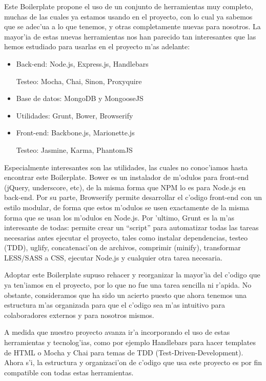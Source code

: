 Este Boilerplate propone el uso de un conjunto de herramientas muy completo, muchas de las cuales ya estamos usando en el proyecto, con lo cual ya sabemos
que se adec'ua a lo que tenemos, y otras completamente nuevas para nosotros. La mayor'ia de estas nuevas herramientas nos han parecido tan interesantes que
las hemos estudiado para usarlas en el proyecto m'as adelante:

\begin{itemize}
 \item Back-end: Node.js, Express.js, Handlebars
 
	Testeo: Mocha, Chai, Sinon, Proxyquire
	
 \item Base de datos: MongoDB y MongooseJS
 
 \item Utilidades: Grunt, Bower, Browserify
 
 \item Front-end: Backbone.js, Marionette.js
 
	Testeo: Jasmine, Karma, PhantomJS
	
\end{itemize}

Especialmente interesantes son las utilidades, las cuales no conoc'iamos hasta encontrar este Boilerplate. Bower es un instalador de m'odulos para front-end
(jQuery, underscore, etc), de la misma forma que NPM lo es para Node.js en back-end. Por su parte, Browserify permite desarrollar el c'odigo front-end con un
estilo modular, de forma que estos m'odulos se usen exactamente de la misma forma que se usan los m'odulos en Node.js. Por 'ultimo, Grunt es la m'as interesante
de todas: permite crear un ``script'' para automatizar todas las tareas necesarias antes ejecutar el proyecto, tales como instalar dependencias, testeo (TDD),
uglify, concatenaci'on de archivos, comprimir (minify), transformar LESS/SASS a CSS, ejecutar Node.js y cualquier otra tarea necesaria.

Adoptar este Boilerplate supuso rehacer y reorganizar la mayor'ia del c'odigo que ya ten'iamos en el proyecto, por lo que no fue una tarea sencilla ni r'apida.
No obstante, consideramos que ha sido un acierto puesto que ahora tenemos una estructura m'as organizada para que el c'odigo sea m'as intuitivo para colaboradores
externos y para nosotros mismos.

A medida que nuestro proyecto avanza ir'a incorporando el uso de estas herramientas y tecnolog'ias, como por ejemplo Handlebars para hacer templates de HTML o Mocha y Chai
para temas de TDD (Test-Driven-Development). Ahora s'i, la estructura y organizaci'on de c'odigo que usa este proyecto es por fin compatible con todas estas
herramientas.



